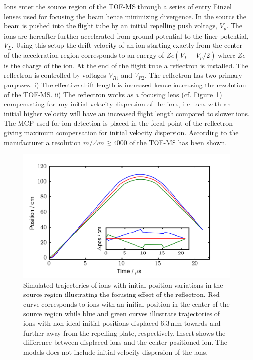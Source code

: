 \documentclass[aip,rsi]{revtex4-1}
\begin{document}
Ions enter the source region of the TOF-MS through a series of entry Einzel lenses used for focusing the beam hence minimizing divergence. In the source the beam is pushed into the flight tube by an initial repelling push voltage, $V_p$. The ions are hereafter further accelerated from ground potential to the liner potential, $V_L$. Using this setup the drift velocity of an ion starting exactly from the center of the acceleration region corresponds to an energy of $Ze\left(V_L + V_p/2\right)$ where $Ze$ is the charge of the ion. At the end of the flight tube a reflectron is installed. The reflectron is controlled by voltages $V_{R1}$ and $V_{R2}$. The reflectron has two primary purposes: i) The effective drift length is increased hence increasing the resolution of the TOF-MS. ii) The reflectron works as a focusing lens (cf. Figure~\ref{fig:trajectory}) compensating for any initial velocity dispersion of the ions, i.e. ions with an initial higher velocity will have an increased flight length compared to slower ions. The MCP used for ion detection is placed in the focal point of the reflectron giving maximum compensation for initial velocity dispersion. According to the manufacturer a resolution $m/\Delta m\gtrsim4000$ of the TOF-MS has been shown.
\begin{figure}
 \includegraphics[width=16cm]{trajectory.png}%
 \caption{Simulated trajectories of ions with initial position variations in the source region illustrating the focusing effect of the reflectron. Red curve corresponds to ions with an initial position in the center of the source region while blue and green curves illustrate trajectories of ions with non-ideal initial positions displaced 6.3\,mm towards and further away from the repelling plate, respectively. Insert shows the difference between displaced ions and the center positioned ion. The models does not include initial velocity dispersion of the ions.\label{fig:trajectory}}%
\end{figure}
\end{document}
